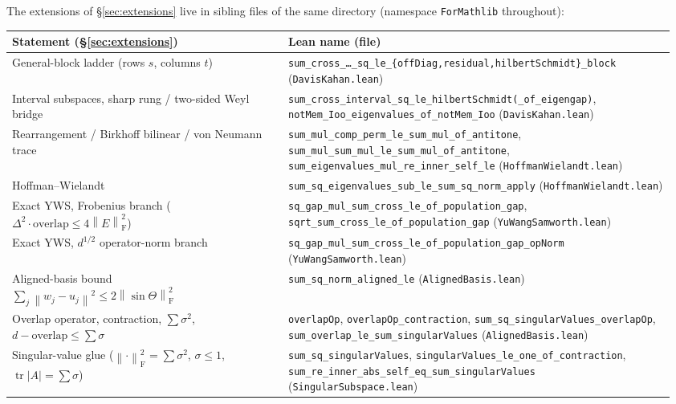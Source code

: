 \documentclass[11pt]{article}
\newcommand{\norm}[1]{\left\lVert #1\right\rVert}
\newcommand{\F}{\mathrm{F}}
\newcommand{\sinT}{\sin\Theta}
\DeclareMathOperator{\tr}{tr}
\theoremstyle{remark}
\begin{document}
The extensions of \S\ref{sec:extensions} live in sibling files of the same
directory (namespace \texttt{ForMathlib} throughout):

\begin{center}
\footnotesize
\setlength{\tabcolsep}{4pt}
\begin{tabular}{@{}p{0.40\linewidth}p{0.56\linewidth}@{}}
\toprule
Statement (\S\ref{sec:extensions}) & Lean name (file) \\
\midrule
General-block ladder (rows $s$, columns $t$)
  & \texttt{sum\_cross\_\dots\_sq\_le\_\{offDiag,residual,hilbertSchmidt\}\_block} (\texttt{DavisKahan.lean}) \\
Interval subspaces, sharp rung / two-sided Weyl bridge
  & \texttt{sum\_cross\_interval\_sq\_le\_hilbertSchmidt(\_of\_eigengap)},
    \texttt{notMem\_Ioo\_eigenvalues\_of\_notMem\_Ioo} (\texttt{DavisKahan.lean}) \\
Rearrangement / Birkhoff bilinear / von Neumann trace
  & \texttt{sum\_mul\_comp\_perm\_le\_sum\_mul\_of\_antitone},
    \texttt{sum\_mul\_sum\_mul\_le\_sum\_mul\_of\_antitone},
    \texttt{sum\_eigenvalues\_mul\_re\_inner\_self\_le} (\texttt{HoffmanWielandt.lean}) \\
Hoffman--Wielandt
  & \texttt{sum\_sq\_eigenvalues\_sub\_le\_sum\_sq\_norm\_apply} (\texttt{HoffmanWielandt.lean}) \\
Exact YWS, Frobenius branch ($\Delta^2\cdot\text{overlap}\le4\norm{E}_{\F}^2$)
  & \texttt{sq\_gap\_mul\_sum\_cross\_le\_of\_population\_gap},
    \texttt{sqrt\_sum\_cross\_le\_of\_population\_gap} (\texttt{YuWangSamworth.lean}) \\
Exact YWS, $d^{1/2}$ operator-norm branch
  & \texttt{sq\_gap\_mul\_sum\_cross\_le\_of\_population\_gap\_opNorm} (\texttt{YuWangSamworth.lean}) \\
Aligned-basis bound $\sum_j\norm{w_j-u_j}^2\le2\norm{\sinT}_{\F}^2$
  & \texttt{sum\_sq\_norm\_aligned\_le} (\texttt{AlignedBasis.lean}) \\
Overlap operator, contraction, $\sum\sigma^2$, $d-\text{overlap}\le\sum\sigma$
  & \texttt{overlapOp}, \texttt{overlapOp\_contraction},
    \texttt{sum\_sq\_singularValues\_overlapOp},
    \texttt{sum\_overlap\_le\_sum\_singularValues} (\texttt{AlignedBasis.lean}) \\
Singular-value glue ($\norm{\cdot}_{\F}^2=\sum\sigma^2$, $\sigma\le1$,
$\tr\lvert A\rvert=\sum\sigma$)
  & \texttt{sum\_sq\_singularValues},
    \texttt{singularValues\_le\_one\_of\_contraction},
    \texttt{sum\_re\_inner\_abs\_self\_eq\_sum\_singularValues} (\texttt{SingularSubspace.lean}) \\

\end{tabular}
\end{center}
\end{document}
